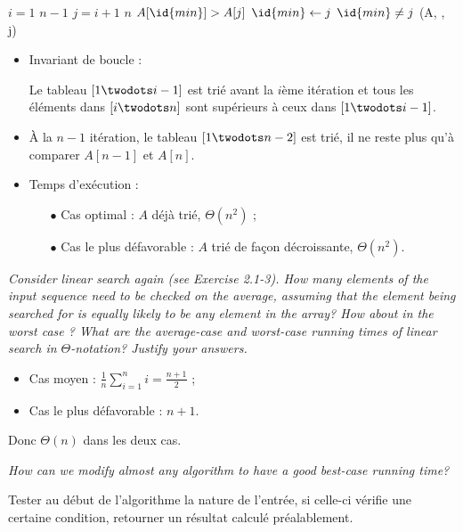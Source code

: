 \begin{description}
  \begin{ex}
    \begin{codebox}
       \li \For $i = 1$ \To $n-1$ \Do
       \li {}
       \li \For $j = i+1$ \To $n$ \Do
       \li \If $A[\id{min}] > A[j]$ \Then
       \li $\id{min} \gets j$ \End \End
       \li \If $\id{min} \ne j$ \Then
       \li {}(A, , j) \End \End%
    \end{codebox}

    \begin{itemize}
      \item Invariant de boucle : 

        Le tableau $[1 \twodots i-1]$ est trié avant la $i$ème itération et tous les éléments dans $[i \twodots n]$ sont supérieurs à ceux dans $[1\twodots i-1]$.

      \item \`A la $n-1$ itération, le tableau $[1\twodots n-2]$ est trié, il ne reste plus qu'à comparer $A[n-1]$ et $A[n]$.

     \item Temps d'exécution :
        \begin{itemize}
          \item[$\bullet$] Cas optimal : $A$ déjà trié, $\Theta(n^2)$ ;
          \item[$\bullet$] Cas le plus défavorable : $A$ trié de fa\c{c}on décroissante, $\Theta(n^2)$.
        \end{itemize}

    \end{itemize}

  \end{ex}

 {\itshape Consider linear search again (see Exercise 2.1-3). How many elements of the input sequence need to be checked on the average, assuming that the element being searched for is equally likely to be any element in the array? How about in the worst case ? What are the average-case and worst-case running times of linear search in $\Theta$-notation? Justify your answers.}

  \begin{ex}
    \begin{itemize}
      \item Cas moyen : $\frac{1}{n}\sum_{i=1}^ni = \frac{n+1}{2}$ ;
      \item Cas le plus défavorable : $n+1$.
    \end{itemize}
    Donc $\Theta(n)$ dans les deux cas.
  \end{ex}

 {\itshape How can we modify almost any algorithm to have a good best-case running time?}

  \begin{ex}
    Tester au début de l'algorithme la nature de l'entrée, si celle-ci vérifie une certaine condition, retourner un résultat calculé préalablement. 
  \end{ex}

\end{description}

